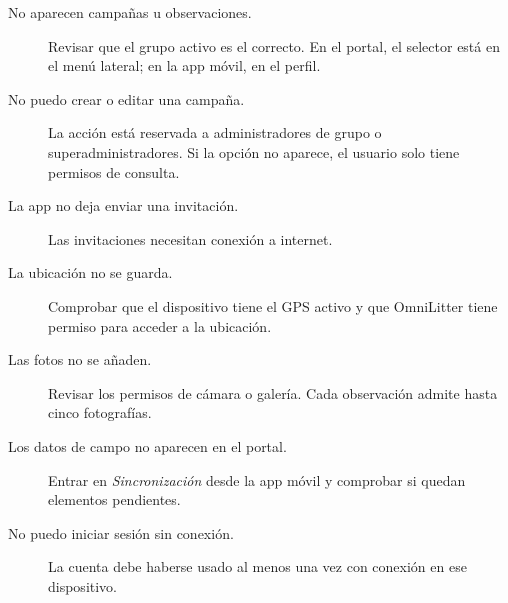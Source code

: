 \begin{description}
  \item[No aparecen campañas u observaciones.] Revisar que el grupo activo es el
  correcto. En el portal, el selector está en el menú lateral; en la app móvil, en
  el perfil.
  \item[No puedo crear o editar una campaña.] La acción está reservada a
  administradores de grupo o superadministradores. Si la opción no aparece, el
  usuario solo tiene permisos de consulta.
  \item[La app no deja enviar una invitación.] Las invitaciones necesitan conexión a
  internet.
  \item[La ubicación no se guarda.] Comprobar que el dispositivo tiene el GPS activo
  y que OmniLitter tiene permiso para acceder a la ubicación.
  \item[Las fotos no se añaden.] Revisar los permisos de cámara o galería. Cada
  observación admite hasta cinco fotografías.
  \item[Los datos de campo no aparecen en el portal.] Entrar en
  \textit{Sincronización} desde la app móvil y comprobar si quedan elementos
  pendientes.
  \item[No puedo iniciar sesión sin conexión.] La cuenta debe haberse usado al menos
  una vez con conexión en ese dispositivo.
\end{description}
